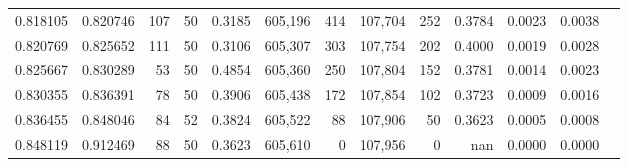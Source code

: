 \begin{tabular}{rrrrrrrrrrrrr}
0.818105 & 0.820746 &   107 &  50 &                                     0.3185 & 605,196 &     414 & 107,704 &     252 & 0.3784 & 0.0023 & 0.0038 \\
0.820769 & 0.825652 &   111 &  50 &                                     0.3106 & 605,307 &     303 & 107,754 &     202 & 0.4000 & 0.0019 & 0.0028 \\
0.825667 & 0.830289 &    53 &  50 &                                     0.4854 & 605,360 &     250 & 107,804 &     152 & 0.3781 & 0.0014 & 0.0023 \\
0.830355 & 0.836391 &    78 &  50 &                                     0.3906 & 605,438 &     172 & 107,854 &     102 & 0.3723 & 0.0009 & 0.0016 \\
0.836455 & 0.848046 &    84 &  52 &                                     0.3824 & 605,522 &      88 & 107,906 &      50 & 0.3623 & 0.0005 & 0.0008 \\
0.848119 & 0.912469 &    88 &  50 &                                     0.3623 & 605,610 &       0 & 107,956 &       0 &    nan & 0.0000 & 0.0000 \\
\bottomrule
\end{tabular}
